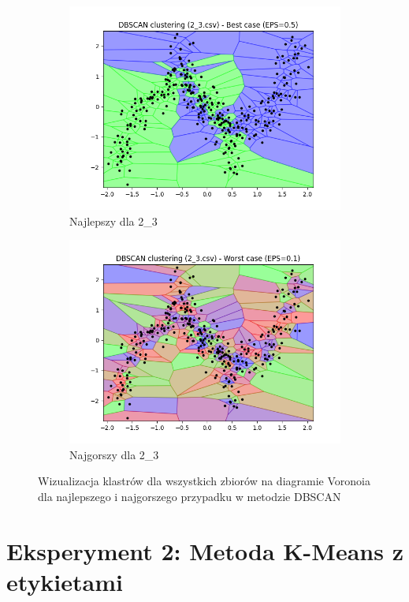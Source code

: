 \documentclass[12pt]{article}
\begin{document}
\begin{figure}[H]
\begin{subfigure}[b]{0.24\textwidth}
        \includegraphics[width=\linewidth]{img/exp_1/dbscan/2_3_best.png}
        \caption{Najlepszy dla 2\_3}
    \end{subfigure}
    \hfill
    \begin{subfigure}[b]{0.24\textwidth}
        \includegraphics[width=\linewidth]{img/exp_1/dbscan/2_3_worst.png}
        \caption{Najgorszy dla 2\_3}
    \end{subfigure}
    \caption{\centering Wizualizacja klastrów dla wszystkich zbiorów na diagramie Voronoia dla najlepszego i najgorszego przypadku w metodzie DBSCAN}
\end{figure}

\section{Eksperyment 2: Metoda K-Means z etykietami}
\end{document}
